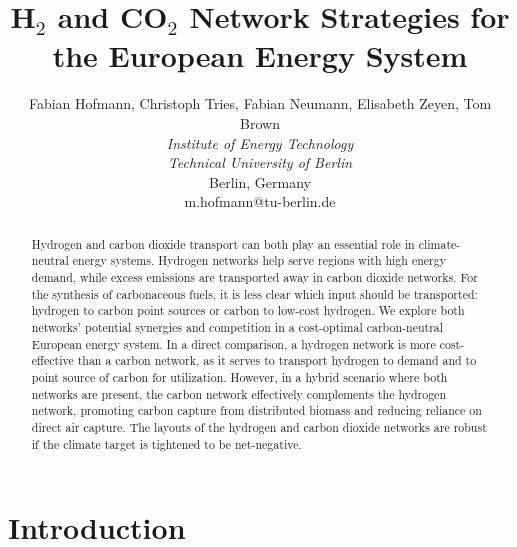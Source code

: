 \documentclass[twocolumn]{article}
\newcommand{\carbon}{CO$_2$}
\newcommand{\hydrogen}{H$_2$}
\begin{document}

\title{\hydrogen{} and \carbon{} Network Strategies for the European Energy System}



\author{
    Fabian Hofmann, Christoph Tries, Fabian Neumann, Elisabeth Zeyen, Tom Brown \\
    \textit{Institute of Energy Technology} \\
    \textit{Technical University of Berlin}\\
    Berlin, Germany \\
    m.hofmann@tu-berlin.de
}


\maketitle

\begin{abstract}
    Hydrogen and carbon dioxide transport can both play an essential role in climate-neutral energy systems. Hydrogen networks help serve regions with high energy demand, while excess emissions are transported away in carbon dioxide networks. For the synthesis of carbonaceous fuels, it is less clear which input should be transported: hydrogen to carbon point sources or carbon to low-cost hydrogen. We explore both networks' potential synergies and competition in a cost-optimal carbon-neutral European energy system. In a direct comparison, a hydrogen network is more cost-effective than a carbon network, as it serves to transport hydrogen to demand and to point source of carbon for utilization. However, in a hybrid scenario where both networks are present, the carbon network effectively complements the hydrogen network, promoting carbon capture from distributed biomass and reducing reliance on direct air capture. The layouts of the hydrogen and carbon dioxide networks are robust if the climate target is tightened to be net-negative.
\end{abstract}


\section{Introduction}
\end{document}
